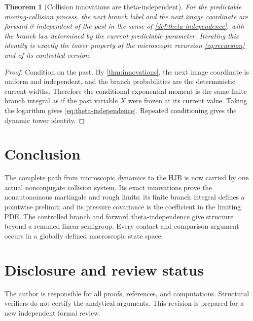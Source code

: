 \documentclass[11pt,reqno]{amsart}
\newtheorem{theorem}{Theorem}[section]
\theoremstyle{definition}
\theoremstyle{remark}
\begin{document}
\begin{theorem}[Collision innovations are theta-independent]\label{thm:theta-independence}
For the predictable moving-collision process, the next branch label and the
next image coordinate are forward $\vartheta$-independent of the past in the
sense of \cref{def:theta-independence}, with the branch law determined by the
current predictable parameter.  Iterating this identity is exactly the tower
property of the microscopic recursion \eqref{eq:recursion} and of its
controlled version.
\end{theorem}

\begin{proof}
Condition on the past.  By \cref{thm:innovations}, the next image coordinate is
uniform and independent, and the branch probabilities are the deterministic
current widths.  Therefore the conditional exponential moment is the same
finite branch integral as if the past variable $X$ were frozen at its current
value.  Taking the logarithm gives \eqref{eq:theta-independence}.  Repeated
conditioning gives the dynamic tower identity.
\end{proof}

\section{Conclusion}

The complete path from microscopic dynamics to the HJB is now carried by one
actual nonconjugate collision system.  Its exact innovations prove the
nonautonomous martingale and rough limits; its finite branch integral defines a
pointwise prelimit; and its pressure covariance is the coefficient in the
limiting PDE.  The controlled branch and forward theta-independence give
structure beyond a renamed linear semigroup.  Every contact and comparison
argument occurs in a globally defined macroscopic state space.

\section*{Disclosure and review status}
The author is responsible for all proofs, references, and computations.
Structural verifiers do not certify the analytical arguments.  This revision
is prepared for a new independent formal review.



\end{document}
